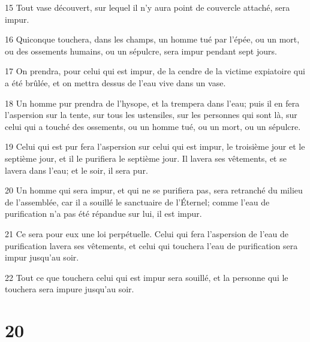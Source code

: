 \par 15 Tout vase découvert, sur lequel il n'y aura point de couvercle attaché, sera impur.
\par 16 Quiconque touchera, dans les champs, un homme tué par l'épée, ou un mort, ou des ossements humains, ou un sépulcre, sera impur pendant sept jours.
\par 17 On prendra, pour celui qui est impur, de la cendre de la victime expiatoire qui a été brûlée, et on mettra dessus de l'eau vive dans un vase.
\par 18 Un homme pur prendra de l'hysope, et la trempera dans l'eau; puis il en fera l'aspersion sur la tente, sur tous les ustensiles, sur les personnes qui sont là, sur celui qui a touché des ossements, ou un homme tué, ou un mort, ou un sépulcre.
\par 19 Celui qui est pur fera l'aspersion sur celui qui est impur, le troisième jour et le septième jour, et il le purifiera le septième jour. Il lavera ses vêtements, et se lavera dans l'eau; et le soir, il sera pur.
\par 20 Un homme qui sera impur, et qui ne se purifiera pas, sera retranché du milieu de l'assemblée, car il a souillé le sanctuaire de l'Éternel; comme l'eau de purification n'a pas été répandue sur lui, il est impur.
\par 21 Ce sera pour eux une loi perpétuelle. Celui qui fera l'aspersion de l'eau de purification lavera ses vêtements, et celui qui touchera l'eau de purification sera impur jusqu'au soir.
\par 22 Tout ce que touchera celui qui est impur sera souillé, et la personne qui le touchera sera impure jusqu'au soir.

\chapter{20}

